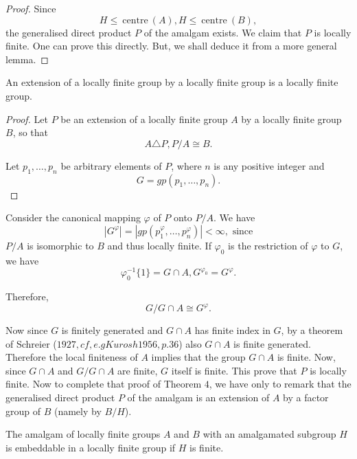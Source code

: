 \begin{proof}
  Since 
  $$
  H \le ~\text{centre}~ (A), H \le ~\text{centre}~ (B),
  $$
  the generalised direct product $P$ of the amalgam exists. We claim
  that $P$ is locally finite. One can prove this directly. But, we
  shall deduce it from a more general lemma. 
\end{proof}

\begin{lemma}
  An extension of a locally finite group by a locally finite group is
  a locally finite group. 
\end{lemma}

\begin{proof}
  Let $P$ be an extension of a locally finite group $A$ by a locally
  finite group $B$, so that  
  $$
  A \triangle P,  P/A \cong B.
  $$

  Let $p_1, \ldots,  p_n$ be arbitrary elements of $P$, where $n$ is
  any positive integer and 
  $$
  G = gp(p_1, \ldots,  p_n).
  $$
\end{proof}

Consider the canonical mapping $\varphi$ of $P$ onto $P/A$. We have
$$
|G^\varphi | = | gp (p^{\varphi}_1, \ldots,  p^{\varphi}_n) | < \infty
,\text{ since} 
$$
$P/A$ is isomorphic to $B$ and thus locally finite. If $\varphi_0$ is
the restriction of $\varphi$ to $G$, we have 
$$
\varphi^{-1}_0 \bigg\{ 1 \bigg \} = G \cap A, G^{\varphi_0} = G^{\varphi}.
$$

Therefore,
$$
G/G \cap A \cong G^{\varphi}.
$$

Now since $G$ is finitely generated and $G \cap A$ has finite index in
$G$, by a theorem of Schreier ($1927, cf, e.g Kurosh 1956, p. 36$)
also $G \cap A$ is finite generated. Therefore the local finiteness of
$A$ implies that the group $G \cap A$ is finite. Now, since $G \cap A$
and $G / G \cap A$ are finite, $G$ itself is finite. This prove that
$P$ is locally finite. Now to complete that proof of Theorem $4$, we
have only to remark that the generalised direct product $P$ of the
amalgam is an extension of $A$ by a factor group of $B$ (namely by
$B/H$). 

\begin{Theorem}%
  The amalgam of locally finite groups $A$ and $B$ with an amalgamated
  subgroup $H$ is embeddable in a locally finite group if $H$ is
  finite. 
\end{Theorem}

